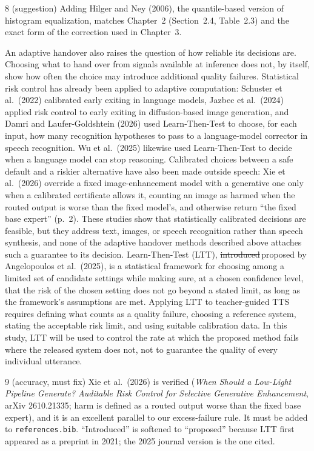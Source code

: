 \documentclass[11pt,a4paper]{article}
\newcommand{\chg}[2]{{\color{delcol}\sout{#1}}\,{\color{addcol}#2}}
\newcounter{cmt}
\begin{document}
\begin{cmt}{8 (suggestion)}
Adding Hilger and Ney (2006), the quantile-based version of histogram equalization, matches Chapter~2 (Section~2.4, Table~2.3) and the exact form of the correction used in Chapter~3.
\end{cmt}

An adaptive handover also raises the question of how reliable its decisions are. Choosing what to hand over from signals available at inference does not, by itself, show how often the choice may introduce additional quality failures. Statistical risk control has already been applied to adaptive computation: Schuster et al.\ (2022) calibrated early exiting in language models, Jazbec et al.\ (2024) applied risk control to early exiting in diffusion-based image generation, and Damri and Laufer-Goldshtein (2026) used Learn-Then-Test to choose, for each input, how many recognition hypotheses to pass to a language-model corrector in speech recognition. Wu et al.\ (2025) likewise used Learn-Then-Test to decide when a language model can stop reasoning. Calibrated choices between a safe default and a riskier alternative have also been made outside speech: Xie et al.\ (2026) override a fixed image-enhancement model with a generative one only when a calibrated certificate allows it, counting an image as harmed when the routed output is worse than the fixed model's, and otherwise return ``the fixed base expert'' (p.~2). These studies show that statistically calibrated decisions are feasible, but they address text, images, or speech recognition rather than speech synthesis, and none of the adaptive handover methods described above attaches such a guarantee to its decision. Learn-Then-Test (LTT), \chg{introduced}{proposed} by Angelopoulos et al.\ (2025), is a statistical framework for choosing among a limited set of candidate settings while making sure, at a chosen confidence level, that the risk of the chosen setting does not go beyond a stated limit, as long as the framework's assumptions are met. Applying LTT to teacher-guided TTS requires defining what counts as a quality failure, choosing a reference system, stating the acceptable risk limit, and using suitable calibration data. In this study, LTT will be used to control the rate at which the proposed method fails where the released system does not, not to guarantee the quality of every individual utterance.

\begin{cmt}{9 (accuracy, must fix)}
Xie et al.\ (2026) is verified (\emph{When Should a Low-Light Pipeline Generate? Auditable Risk Control for Selective Generative Enhancement}, arXiv 2610.21335; harm is defined as a routed output worse than the fixed base expert), and it is an excellent parallel to our excess-failure rule. It must be added to \texttt{references.bib}. ``Introduced'' is softened to ``proposed'' because LTT first appeared as a preprint in 2021; the 2025 journal version is the one cited.
\end{cmt}
\end{document}
